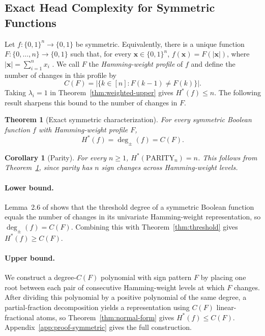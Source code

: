 \documentclass{article}
\newtheorem{theorem}{Theorem}
\theoremstyle{definition}
\theoremstyle{plain}
\newtheorem{corollary}{Corollary}
\newcommand{\hstar}{H^{\ast}}
\newcommand{\tdeg}{\deg_{\pm}}
\newcommand{\bits}{\{0,1\}}
\newcommand{\signchanges}{C(F)}
\begin{document}
\subsection{Exact Head Complexity for Symmetric Functions}

Let $f:\bits^n\to\bits$ be symmetric. Equivalently, there is a unique function $F:\{0,\ldots,n\}\to\bits$ such that, for every $\mathbf{x}\in\bits^n$, $f(\mathbf{x})=F(|\mathbf{x}|)$, where $|\mathbf{x}|=\sum_{i=1}^{n}x_i$ \citep{paturi1992degree}. We call $F$ the \emph{Hamming-weight profile} of $f$ and define the number of changes in this profile by
\begin{equation}
\signchanges=\left|\{k\in[n]:F(k-1)\neq F(k)\}\right|.
\label{eq:sign-changes}
\end{equation}
Taking $\lambda_i=1$ in Theorem~\ref{thm:weighted-upper} gives $\hstar(f)\leq n$. The following result sharpens this bound to the number of changes in $F$.

\begin{theorem}[Exact symmetric characterization]
\label{thm:symmetric}
For every symmetric Boolean function $f$ with Hamming-weight profile $F$,
\begin{equation*}
\hstar(f)=\tdeg(f)=\signchanges.
\end{equation*}
\end{theorem}

\begin{corollary}[Parity]
\label{cor:parity}
For every $n\geq1$, $\hstar(\mathrm{PARITY}_n)=n$. This follows from Theorem~\ref{thm:symmetric}, since parity has $n$ sign changes across Hamming-weight levels.
\end{corollary}

\paragraph{Lower bound.}
Lemma~2.6 of \citet{aspnes1994expressive} shows that the threshold degree of a symmetric Boolean function equals the number of changes in its univariate Hamming-weight representation, so $\tdeg(f)=\signchanges$. Combining this with Theorem~\ref{thm:threshold} gives $\hstar(f)\geq\signchanges$.

\paragraph{Upper bound.}
We construct a degree-$\signchanges$ polynomial with sign pattern $F$ by placing one root between each pair of consecutive Hamming-weight levels at which $F$ changes. After dividing this polynomial by a positive polynomial of the same degree, a partial-fraction decomposition yields a representation using $\signchanges$ linear-fractional atoms, so Theorem~\ref{thm:normal-form} gives $\hstar(f)\leq\signchanges$. Appendix~\ref{app:proof-symmetric} gives the full construction.
\end{document}
